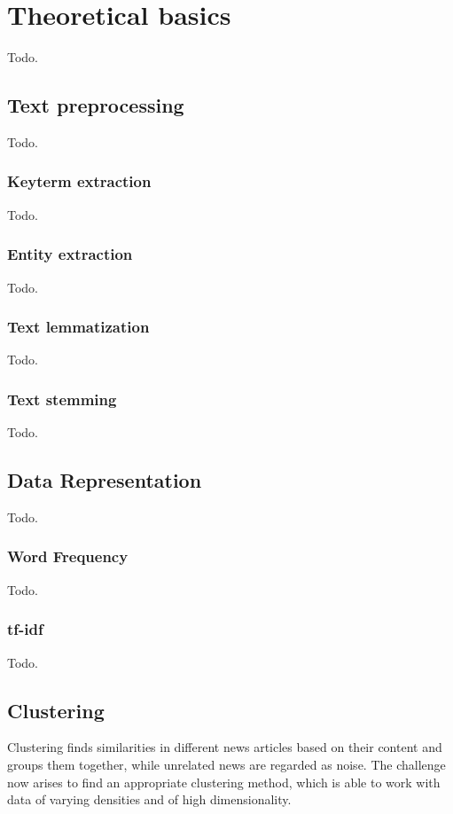 \section{Theoretical basics}
Todo.

\subsection{Text preprocessing}
Todo.

\subsubsection{Keyterm extraction}
Todo.

\subsubsection{Entity extraction}
Todo.

\subsubsection{Text lemmatization}
Todo.

\subsubsection{Text stemming}
Todo.

\subsection{Data Representation}
Todo.

\subsubsection{Word Frequency}
Todo.

\subsubsection{tf-idf}
Todo.

\subsection{Clustering}
Clustering finds similarities in different news articles based on their content and groups them together,
while unrelated news are regarded as noise.
The challenge now arises to find an appropriate clustering method,
which is able to work with data of varying densities and of high dimensionality.

